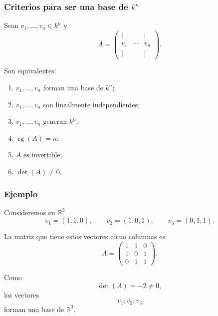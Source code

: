 \begin{frame}
    \frametitle{Criterios para ser una base de \(k^n\)}

\begin{proposition}
    Sean
    \(
        v_1,\ldots,v_n\in k^n
    \)
    y
    \[
        A=
        \begin{pmatrix}
            \vert & & \vert\\
            v_1 & \cdots & v_n\\
            \vert & & \vert
        \end{pmatrix}.
    \]

    Son equivalentes:

    \begin{enumerate}
        \item \(v_1,\ldots,v_n\) forman una base de \(k^n\);
        \item \(v_1,\ldots,v_n\) son linealmente independientes;
        \item \(v_1,\ldots,v_n\) generan \(k^n\);
        \item \(\operatorname{rg}(A)=n\);
        \item \(A\) es invertible;
        \item \(\det(A)\neq0\).
    \end{enumerate}
\end{proposition}
\end{frame}


\begin{frame}
    \frametitle{Ejemplo}

    Consideremos en \(\mathbb{R}^3\)
    \[
        v_1=(1,1,0),\qquad
        v_2=(1,0,1),\qquad
        v_3=(0,1,1).
    \]

    La matriz que tiene estos vectores como columnas es
    \[
        A=
        \begin{pmatrix}
            1&1&0\\
            1&0&1\\
            0&1&1
        \end{pmatrix}.
    \]

    Como
    \[
        \det(A)=-2\neq0,
    \]
    los vectores
    \[
        v_1,v_2,v_3
    \]
    forman una base de \(\mathbb{R}^3\).
\end{frame}


